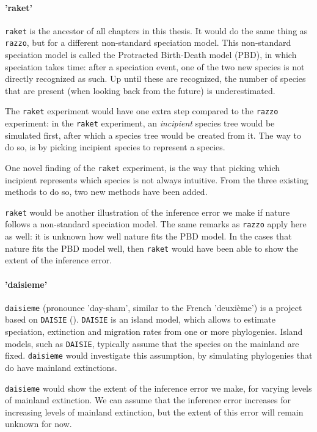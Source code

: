 \paragraph{'raket'} 

\verb;raket; is the ancestor of all chapters in this thesis.
It would do the same thing as \verb;razzo;, but for a different non-standard 
speciation model. This non-standard speciation model is
called the Protracted Birth-Death model (PBD), in which speciation
takes time: after a speciation event, one of the two new species is not
directly recognized as such. Up until these are recognized, the number
of species that are present (when looking back from the future) 
is underestimated.

The \verb;raket; experiment would have one extra step compared to the \verb;razzo;
experiment: in the \verb;raket; experiment, an \emph{incipient} species tree
would be simulated first, after which a species tree would be created
from it. The way to do so, is by picking incipient species to represent
a species.

One novel finding of the \verb;raket; experiment, is the way that picking
which incipient represents which species is not always intuitive.
From the three existing methods to do so, two new methods have been added. 

\verb;raket; would be another illustration of the inference error we make
if nature follows a non-standard speciation model. The same remarks as
\verb;razzo; apply here as well: it is unknown how well nature fits the PBD model.
In the cases that nature fits the PBD model well, then \verb;raket; would have
been able to show the extent of the inference error.

\paragraph{'daisieme'}

\verb;daisieme; (pronounce 'day-sham', similar to the French 'deuxième') is
a project based on \verb;DAISIE; (\cite{daisie}). \verb;DAISIE; is an island model,
which allows to estimate speciation, extinction and migration rates 
from one or more phylogenies. Island models, such as \verb;DAISIE;, typically
assume that the species on the mainland are fixed. \verb;daisieme; would
investigate this assumption, by simulating phylogenies that do have
mainland extinctions.

\verb;daisieme; would show the extent of the inference error we make,
for varying levels of mainland extinction. We can assume that the inference 
error increases for increasing levels of mainland extinction, but the extent
of this error will remain unknown for now.

